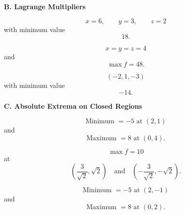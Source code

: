 \documentclass[10pt]{article}
\newcommand{\answerbar}[1]{%
  \vspace{0.30em}%
  \noindent\colorbox{sectiongray}{%
    \parbox{\dimexpr\textwidth-2\fboxsep\relax}{%
      \strut\textbf{#1}\strut
    }%
  }%
  \par\vspace{0.30em}%
}
\begin{document}

\answerbar{B. Lagrange Multipliers}

\begin{parts}

\item
\[
\boxed{x=6,\qquad y=3,\qquad z=2}
\]
with minimum value
\[
\boxed{18}.
\]

\item
\[
\boxed{x=y=z=4}
\]
and
\[
\boxed{\max f=48}.
\]

\item
\[
\boxed{(-2,1,-3)}
\]
with minimum value
\[
\boxed{-14}.
\]

\end{parts}


\answerbar{C. Absolute Extrema on Closed Regions}

\begin{parts}

\item
\[
\boxed{\text{Minimum }=-5\text{ at }(2,1)}
\]
and
\[
\boxed{\text{Maximum }=8\text{ at }(0,4)}.
\]

\item
\[
\boxed{\max f=10}
\]
at
\[
\boxed{
\left(\frac{3}{\sqrt2},\sqrt2\right)
\quad\text{and}\quad
\left(-\frac{3}{\sqrt2},-\sqrt2\right)
}.
\]

\item
\[
\boxed{\text{Minimum }=-5\text{ at }(2,-1)}
\]
and
\[
\boxed{\text{Maximum }=8\text{ at }(0,2)}.
\]

\end{parts}
\end{document}
